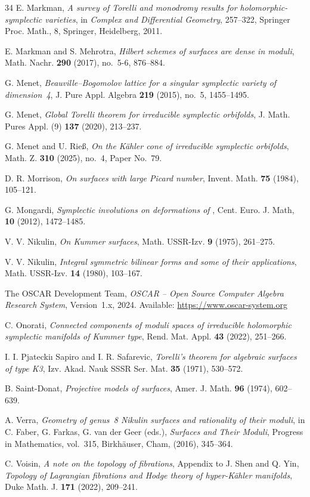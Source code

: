 \documentclass{amsart}
\makeatletter
\theoremstyle{definition}
\numberwithin{equation}{section}
\numberwithin{equation}{section} \theoremstyle{definition}
\newcounter{mathrecordid}
\newcommand{\mathboxbegin}[1]{%
  \stepcounter{mathrecordid}%
  \immediate\write\mathrecords{\themathrecordid,#1}%
  \special{pdf:bann << /Type /Annot /Subtype /Link /Border [0 0 0]
    /MathBoxID \themathrecordid /F 2
    /A << /S /URI /URI (urn:mathbox:\themathrecordid) >> >>}}
\newcommand{\mathboxinlineplain}[1]{$#1$}
\newcommand{\mathboxinline}[1]{%
  $\mathboxbegin{inline}#1\special{pdf:eann}$}
\newcommand{\recordmath}{%
  \ifmeasuring@\expandafter\mathboxinlineplain
  \else\expandafter\mathboxinline\fi}
\makeatother
\begin{document}
\begin{thebibliography}{34}
 E. Markman,
  \emph{A survey of Torelli and monodromy results for holomorphic-symplectic
  varieties}, in {\it Complex and Differential Geometry}, 257--322, Springer
  Proc. Math., 8, Springer, Heidelberg, 2011.

 E. Markman and S. Mehrotra,
  \emph{Hilbert schemes of \recordmath{K3} surfaces are dense in moduli},
  Math. Nachr. {\bf 290} (2017), no.~5-6, 876--884.

 G. Menet,
  \emph{Beauville--Bogomolov lattice for a singular symplectic variety of
  dimension~4}, J. Pure Appl. Algebra {\bf 219} (2015), no.~5, 1455--1495.

 G. Menet,
  \emph{Global Torelli theorem for irreducible symplectic orbifolds},
  J. Math. Pures Appl. (9) {\bf 137} (2020), 213--237.

 G. Menet and U. Rie\ss,
  \emph{On the K\"ahler cone of irreducible symplectic orbifolds},
  Math. Z. {\bf 310} (2025), no.~4, Paper No.~79.

 D. R. Morrison,
  \emph{On \recordmath{K3} surfaces with large Picard number},
  Invent. Math. {\bf 75} (1984), 105--121.

 G. Mongardi,
  \emph{Symplectic involutions on deformations of \recordmath{K3^{[2]}}}, Cent. Euro. J. Math,
 {\bf 10} (2012), 1472--1485.
 
  V. V. Nikulin,
  \emph{On Kummer surfaces}, Math. USSR-Izv. {\bf 9} (1975), 261--275.


 V. V. Nikulin,
  \emph{Integral symmetric bilinear forms and some of their applications},
  Math. USSR-Izv. {\bf 14} (1980), 103--167.


  The OSCAR Development Team,
  \textit{OSCAR -- Open Source Computer Algebra Research System},
  Version~1.x,
  2024.
  Available: \url{https://www.oscar-system.org}


 C. Onorati,
  \emph{Connected components of moduli spaces of irreducible holomorphic
  symplectic manifolds of Kummer type},
  Rend. Mat. Appl. {\bf 43} (2022), 251--266.
 
   I. I. Pjateckiı Sapiro and I. R.
Safarevic, \emph{Torelli’s theorem for algebraic surfaces of
type K3}, Izv. Akad. Nauk SSSR Ser. Mat. {\bf 35} (1971), 530–572.

 B. Saint-Donat,
  \emph{Projective models of \recordmath{K3} surfaces},
  Amer. J. Math. {\bf 96} (1974), 602--639.

 A. Verra,
  \emph{Geometry of genus~8 Nikulin surfaces and rationality of their moduli},
  in C. Faber, G. Farkas, G. van der Geer (eds.), {\it \recordmath{K3} Surfaces and Their
  Moduli}, Progress in Mathematics, vol.~315, Birkh\"auser, Cham, (2016),
   345--364.

 C. Voisin, \emph{A note on the topology of fibrations}, Appendix to J. Shen and Q. Yin, \emph{Topology of Lagrangian fibrations and Hodge theory of hyper-K\"ahler manifolds}, Duke Math. J. {\bf 171} (2022), 209--241.
\end{thebibliography}
\end{document}
